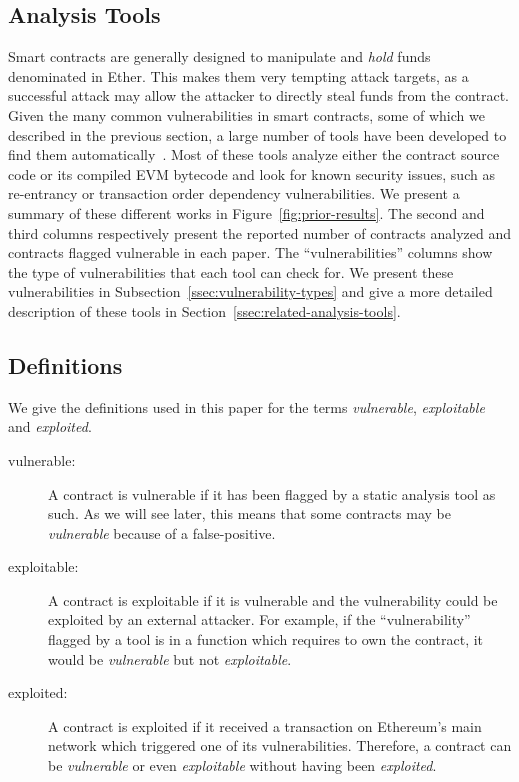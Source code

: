 
\subsection{Analysis Tools}
\label{ssec:analysis-tools}
Smart contracts are generally designed to manipulate and \emph{hold} funds denominated in Ether. This makes them very tempting attack targets, as a successful attack may allow the attacker to directly steal funds from the contract. Given the many common vulnerabilities in smart contracts, some of which we described in the previous section, a large number of tools have been developed to find them automatically~\cite{Luu2016a,Tsankov2018,mythril}. Most of these tools analyze either the contract source code or its compiled EVM bytecode and look for known security issues, such as re-entrancy or transaction order dependency vulnerabilities. We present a summary of these different works in Figure~\ref{fig:prior-results}. The second and third columns respectively present the reported number of contracts analyzed and contracts flagged vulnerable in each paper. The ``vulnerabilities'' columns show the type of vulnerabilities that each tool can check for. We present these vulnerabilities in Subsection~\ref{ssec:vulnerability-types} and give a more detailed description of these tools in Section~\ref{ssec:related-analysis-tools}.

\subsection{Definitions}
\label{ssec:definitions}
We give the definitions used in this paper for the terms \emph{vulnerable}, \emph{exploitable} and \emph{exploited}.
\begin{description}
\item[vulnerable:]
  A contract is vulnerable if it has been flagged by a static analysis tool as such.
  As we will see later, this means that some contracts may be \emph{vulnerable} because of a false-positive.
\item[exploitable:]
  A contract is exploitable if it is vulnerable and the vulnerability could be exploited by an external attacker.
  For example, if the ``vulnerability'' flagged by a tool is in a function which requires to own the contract, it would be \emph{vulnerable} but not \emph{exploitable}.
\item[exploited:]
  A contract is exploited if it received a transaction on Ethereum's main network which triggered one of its vulnerabilities.
  Therefore, a contract can be \emph{vulnerable} or even \emph{exploitable} without having been \emph{exploited}.
\end{description}

